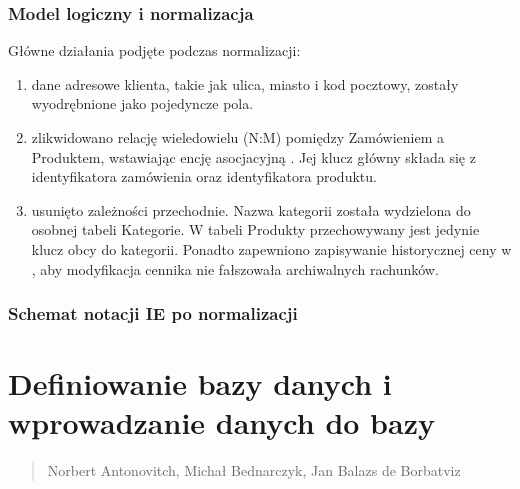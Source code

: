 \documentclass[a4paper,11pt,english,openany,oneside]{sphinxmanual}
\begin{document}
\subsection{Model logiczny i normalizacja}
\label{\detokenize{rozdzial_3/index:model-logiczny-i-normalizacja}}
\sphinxAtStartPar
Główne działania podjęte podczas normalizacji:
\begin{enumerate}
%
\item {} 
\sphinxAtStartPar
{} dane adresowe klienta, takie jak ulica, miasto i kod pocztowy, zostały wyodrębnione jako pojedyncze pola.

\item {} 
\sphinxAtStartPar
{} zlikwidowano relację wiele\sphinxhyphen{}do\sphinxhyphen{}wielu (N:M) pomiędzy Zamówieniem a Produktem, wstawiając encję asocjacyjną . Jej klucz główny składa się z identyfikatora zamówienia oraz identyfikatora produktu.

\item {} 
\sphinxAtStartPar
{} usunięto zależności przechodnie. Nazwa kategorii została wydzielona do osobnej tabeli Kategorie. W tabeli Produkty przechowywany jest jedynie klucz obcy do kategorii. Ponadto zapewniono zapisywanie historycznej ceny w , aby modyfikacja cennika nie fałszowała archiwalnych rachunków.

\end{enumerate}


\subsection{Schemat notacji IE po normalizacji}
\label{\detokenize{rozdzial_3/index:schemat-notacji-ie-po-normalizacji}}\begin{quote}

\noindent{}
\end{quote}

\sphinxstepscope


\chapter{Definiowanie bazy danych i wprowadzanie danych do bazy}
\label{\detokenize{rozdzial_4/index:definiowanie-bazy-danych-i-wprowadzanie-danych-do-bazy}}\label{\detokenize{rozdzial_4/index::doc}}\begin{quote}\begin{description}
\sphinxAtStartPar
Norbert Antonovitch, Michał Bednarczyk, Jan Balazs de Borbatviz

\end{description}\end{quote}
\end{document}

